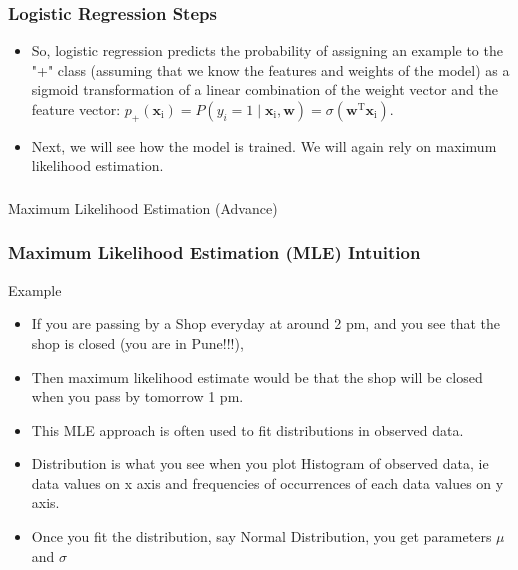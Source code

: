 \begin{frame}[fragile]\frametitle{Logistic Regression Steps}
 \begin{itemize}

\item So, logistic regression predicts the probability of assigning an example to the "+" class (assuming that we know the features and weights of the model) as a sigmoid transformation of a linear combination of the weight vector and the feature vector:
$ p_+(\textbf{x}_\text{i}) = P\left(y_i = 1 \mid \textbf{x}_\text{i}, \textbf{w}\right) = \sigma(\textbf{w}^\text{T}\textbf{x}_\text{i}).$
\item Next, we will see how the model is trained. We will again rely on maximum likelihood estimation.
\end{itemize}

\end{frame}

\begin{frame}[fragile]\frametitle{}
\begin{center}
{\Large Maximum Likelihood Estimation (Advance)}
\end{center}
\end{frame}


\begin{frame}[fragile]\frametitle{Maximum Likelihood Estimation (MLE) Intuition}
Example
 \begin{itemize}
\item If you are passing by a Shop everyday at around 2 pm, and you see that the shop is closed (you are in Pune!!!), 
\item Then maximum likelihood estimate would be that the shop will be closed when you pass by tomorrow 1 pm.
\item This MLE approach is often used to fit distributions in observed data.
\item Distribution is what you see when you plot Histogram of observed data, ie data values on x axis and frequencies of occurrences of each data values on y axis.
\item Once you fit the distribution, say Normal Distribution, you get parameters $\mu$ and $\sigma$
\end{itemize}

\end{frame}

